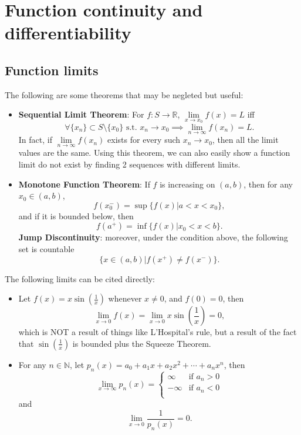 \documentclass[a4paper,10pt]{article}
\newcommand{\R}{\mathbb{R}}
\begin{document}
\section{Function continuity and differentiability}
\subsection{Function limits}
\noindent The following are some theorems that may be negleted but useful:
\begin{itemize}
    \item \textbf{Sequential Limit Theorem}: For $f:S\to\R$, $\lim\limits_{x\to x_0}f(x)=L$
        iff\[
            \forall \{x_n\} \subset S \setminus \{x_0\} \text{ s.t. } x_n\to x_0 
                        \implies \lim\limits_{n\to\infty}f(x_n)=L.
        \]
        In fact, if $\lim\limits_{n\to\infty}f(x_n)$ exists for every such $x_n\to x_0$, then all the limit values are the same.
        Using this theorem, we can also easily show a function limit do not exist by finding 2 sequences with different limits.
    \item \textbf{Monotone Function Theorem}: If $f$ is increasing on $(a,b)$, then for any $x_0\in(a,b)$, \[
        f(x_0^-) = \sup\{f(x) | a<x<x_0\},
    \]
    and if it is bounded below, then\[
        f(a^+) = \inf\{f(x) | x_0<x<b\}.
    \]
    \textbf{Jump Discontinuity}: moreover, under the condition above, the following set is countable\[
        \{x\in(a,b) | f(x^+)\neq f(x^-)\}.
    \]
\end{itemize}
The following limits can be cited directly:
\begin{itemize}
    \item Let $f(x)=x\sin(\frac{1}{x})$ whenever $x\neq 0$, and $f(0)=0$, then\[
        \lim\limits_{x\to 0}f(x) = \lim\limits_{x\to 0}x\sin(\frac{1}{x}) = 0,
    \]
    which is NOT a result of things like L'Hospital's rule, but a result of the fact that $\sin(\frac{1}{x})$ is bounded plus the Squeeze Theorem.
    \item For any $n\in\mathbb{N}$, let $p_n(x) = a_0 + a_1x + a_2x^2 + \cdots + a_nx^n$, then\[
        \lim\limits_{x\to \infty}p_n(x) = \begin{cases}
            \infty & \text{if } a_n>0\\
            -\infty & \text{if } a_n<0\\
        \end{cases}
    \]
    and \[
        \lim\limits_{x\to 0}\frac{1}{p_n(x)} = 0.
    \]
\end{itemize}
\end{document}
